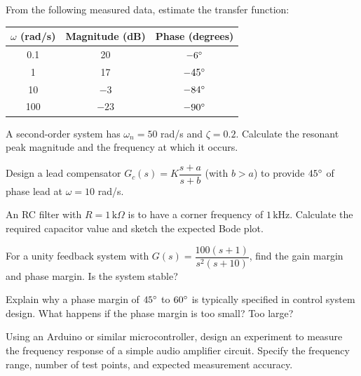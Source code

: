 \begin{exercise}
From the following measured data, estimate the transfer function:
\begin{center}
\begin{tabular}{ccc}
\toprule
$\omega$ (rad/s) & Magnitude (dB) & Phase (degrees) \\
\midrule
0.1 & 20 & $-6^\circ$ \\
1 & 17 & $-45^\circ$ \\
10 & $-3$ & $-84^\circ$ \\
100 & $-23$ & $-90^\circ$ \\
\bottomrule
\end{tabular}
\end{center}
\end{exercise}

\begin{exercise}
A second-order system has $\omega_n = 50$ rad/s and $\zeta = 0.2$. Calculate the resonant peak magnitude and the frequency at which it occurs.
\end{exercise}

\begin{exercise}
Design a lead compensator $G_c(s) = K\dfrac{s+a}{s+b}$ (with $b > a$) to provide $45^\circ$ of phase lead at $\omega = 10$ rad/s.
\end{exercise}

\begin{exercise}
An RC filter with $R = 1\,\text{k}\Omega$ is to have a corner frequency of $1\,\text{kHz}$. Calculate the required capacitor value and sketch the expected Bode plot.
\end{exercise}

\begin{exercise}
For a unity feedback system with $G(s) = \dfrac{100(s+1)}{s^2(s+10)}$, find the gain margin and phase margin. Is the system stable?
\end{exercise}

\begin{exercise}
Explain why a phase margin of $45^\circ$ to $60^\circ$ is typically specified in control system design. What happens if the phase margin is too small? Too large?
\end{exercise}

\begin{exercise}
Using an Arduino or similar microcontroller, design an experiment to measure the frequency response of a simple audio amplifier circuit. Specify the frequency range, number of test points, and expected measurement accuracy.
\end{exercise}

